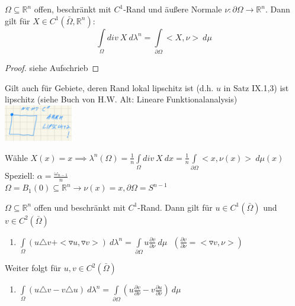 \begin{theorem}
  $\Omega \subseteq \mathbb{R}^n$ offen, beschränkt mit $C^1$-Rand und äußere Normale $\nu:\partial\Omega\to\mathbb{R}^n$. Dann gilt für $X\in C^1(\bar{\Omega}, \mathbb{R}^n)$:
  $$\int\limits_{\Omega} div \ X \ d\lambda^n = \int\limits_{\partial\Omega} <X, \nu> \ d\mu$$
\end{theorem}
\begin{proof}
  siehe Aufschrieb
\end{proof}

\begin{remark}
  Gilt auch für Gebiete, deren Rand lokal lipschitz ist (d.h. $u$ in Satz IX.1,3) ist lipschitz (siehe Buch von H.W. Alt: Lineare Funktionalanalysis) \\
  \includegraphics[width=3cm]{img/IX_7_Bem.png}
\end{remark}

\begin{example}
  Wähle $X(x) = x \implies \lambda^n(\Omega) = \frac{1}{n} \int\limits_{\Omega} div \ X \ dx = \frac{1}{n} \int\limits_{\partial \Omega} <x, \nu(x)> \ d\mu(x)$\\
  Speziell: $\alpha = \frac{\omega_{n-1}}{n}$\\
  $\Omega = B_1(0) \subseteq \mathbb{R}^n \rightarrow \nu(x) = x, \partial\Omega = S^{n-1}$ 
\end{example}

\newpage
\begin{lemma}
  $\Omega \subseteq \mathbb{R}^n$ offen und beschränkt mit $C^1$-Rand. Dann gilt für $u \in C^1(\bar{\Omega})$ und $v \in C^2(\bar{\Omega})$
  \begin{enumerate}
    \item $\int\limits_{\Omega}(u \triangle v + <\triangledown u, \triangledown v>) \ d\lambda^n = \int\limits_{\partial \Omega} u \frac{\partial v}{\partial \nu} \ d\mu \ \ \ (\frac{\partial v}{\partial \nu} = <\triangledown v, \nu>)$
  \end{enumerate}
  Weiter folgt für $u,v \in C^2(\bar{\Omega})$
  \begin{enumerate}[resume]
    \item $\int\limits_{\Omega} (u \triangle v - v \triangle u) \ d\lambda^n = \int\limits_{\partial \Omega}(u \frac{\partial v}{\partial \nu} - v \frac{\partial u}{\partial \nu}) \ d\mu$
  \end{enumerate}
\end{lemma}

